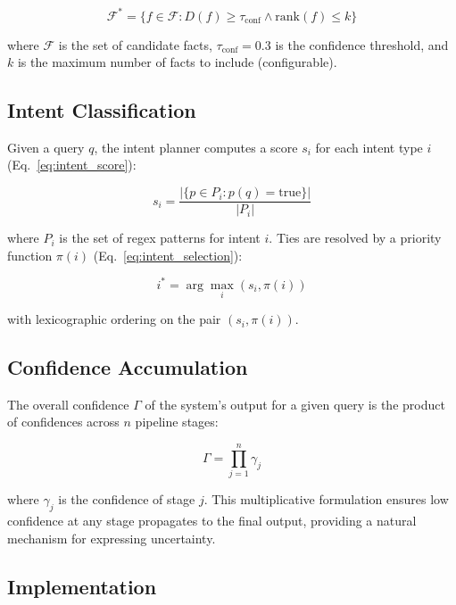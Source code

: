 \documentclass[conference]{IEEEtran}
\begin{document}
\begin{equation}
\mathcal{F}^* = \{f \in \mathcal{F} : D(f) \geq \tau_{\text{conf}} \land \text{rank}(f) \leq k\}
\label{eq:selection}
\end{equation}

where $\mathcal{F}$ is the set of candidate facts, $\tau_{\text{conf}} = 0.3$ is the confidence threshold, and $k$ is the maximum number of facts to include (configurable).

\subsection{Intent Classification}
Given a query $q$, the intent planner computes a score $s_i$ for each intent type $i$ (Eq.~\eqref{eq:intent_score}):

\begin{equation}
s_i = \frac{|\{p \in P_i : p(q) = \text{true}\}|}{|P_i|}
\label{eq:intent_score}
\end{equation}

where $P_i$ is the set of regex patterns for intent $i$. Ties are resolved by a priority function $\pi(i)$ (Eq.~\eqref{eq:intent_selection}):

\begin{equation}
i^* = \arg\max_i \left(s_i, \pi(i)\right)
\label{eq:intent_selection}
\end{equation}

with lexicographic ordering on the pair $(s_i, \pi(i))$.

\subsection{Confidence Accumulation}
The overall confidence $\Gamma$ of the system's output for a given query is the product of confidences across $n$ pipeline stages:

\begin{equation}
\Gamma = \prod_{j=1}^{n} \gamma_j
\label{eq:confidence_product}
\end{equation}

where $\gamma_j$ is the confidence of stage $j$. This multiplicative formulation ensures low confidence at any stage propagates to the final output, providing a natural mechanism for expressing uncertainty.

\subsection{Implementation}
\end{document}
